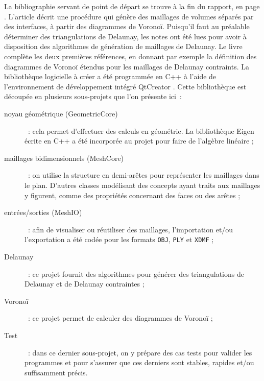 \documentclass[12pt,a4paper]{report}
\begin{document}
La bibliographie servant de point de départ se trouve à la fin du rapport, en page \pageref{biblio}. L'article \cite{Garimella} décrit une procédure qui génère des maillages de volumes séparés par des interfaces, à partir des diagrammes de Voronoï. Puisqu'il faut au préalable déterminer des triangulations de Delaunay, les notes \cite{delnotes} ont été lues pour avoir à disposition des algorithmes de génération de maillages de Delaunay. Le livre \cite{Edelsbrunner} complète les deux premières références, en donnant par exemple la définition des diagrammes de Voronoï étendus pour les maillages de Delaunay contraints.
\vspace{1cm}
La bibliothèque logicielle à créer a été programmée en C++ à l'aide de l'environnement de développement intégré QtCreator \cite{QtCreator}. Cette bibliothèque est découpée en plusieurs sous-projets que l'on présente ici~:
\begin{description}
\item[noyau géométrique (GeometricCore)]~: cela permet d'effectuer des calculs en géométrie. La bibliothèque Eigen \cite{Eigen} écrite en C++ a été incorporée au projet pour faire de l'algèbre linéaire ;
\item[maillages bidimensionnels (MeshCore)]~: on utilise la structure en demi-arêtes pour représenter les maillages dans le plan. D'autres classes modélisant des concepts ayant traits aux maillages y figurent, comme des propriétés concernant des faces ou des arêtes ;
\item[entrées/sorties (MeshIO)]~: afin de visualiser ou réutiliser des maillages, l'importation et/ou l'exportation a été codée pour les formats \verb+OBJ+, \verb+PLY+ et \verb+XDMF+\footnotemark {} ;
\item[Delaunay]~: ce projet fournit des algorithmes pour générer des triangulations de Delaunay et de Delaunay contraintes ;
\item[Voronoï]~: ce projet permet de calculer des diagrammes de Voronoï ;
\item[Test]~: dans ce dernier sous-projet, on y prépare des cas tests pour valider les programmes et pour s'assurer que ces derniers sont stables, rapides et/ou suffisamment précis.
\end{description}
\end{document}
